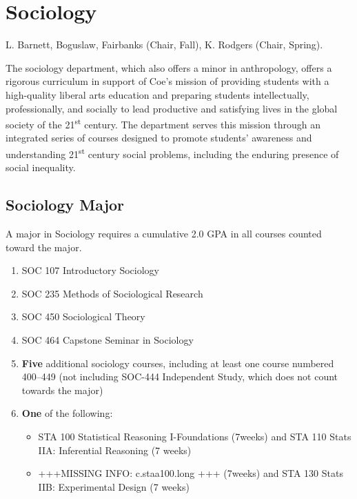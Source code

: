 \documentclass[
  letterpaper,
]{scrbook}
\providecommand{\tightlist}{%
  \setlength{\itemsep}{0pt}\setlength{\parskip}{0pt}}
\begin{document}
\section{Sociology}\label{sociology}

L. Barnett, Boguslaw, Fairbanks (Chair, Fall), K. Rodgers (Chair,
Spring).

The sociology department, which also offers a minor in anthropology,
offers a rigorous curriculum in support of Coe's mission of providing
students with a high-quality liberal arts education and preparing
students intellectually, professionally, and socially to lead productive
and satisfying lives in the global society of the 21\textsuperscript{st}
century. The department serves this mission through an integrated series
of courses designed to promote students' awareness and understanding
21\textsuperscript{st} century social problems, including the enduring
presence of social inequality.

\subsection{Sociology Major}\label{sociology-major}

A major in Sociology requires a cumulative 2.0 GPA in all courses
counted toward the major.

\begin{enumerate}
\def\labelenumi{\arabic{enumi}.}
\item
  SOC 107 Introductory Sociology
\item
  SOC 235 Methods of Sociological Research
\item
  SOC 450 Sociological Theory
\item
  SOC 464 Capstone Seminar in Sociology
\item
  \textbf{Five} additional sociology courses, including at least one
  course numbered 400--449 (not including SOC-444 Independent Study,
  which does not count towards the major)
\item
  \textbf{One} of the following:

  \begin{itemize}
  \tightlist
  \item
    STA 100 Statistical Reasoning I-Foundations (7weeks) and STA 110
    Stats IIA: Inferential Reasoning (7 weeks)
  \item
    +++MISSING INFO: c.staa100.long +++ (7weeks) and STA 130 Stats IIB:
    Experimental Design (7 weeks)
  \end{itemize}
\end{enumerate}
\end{document}
